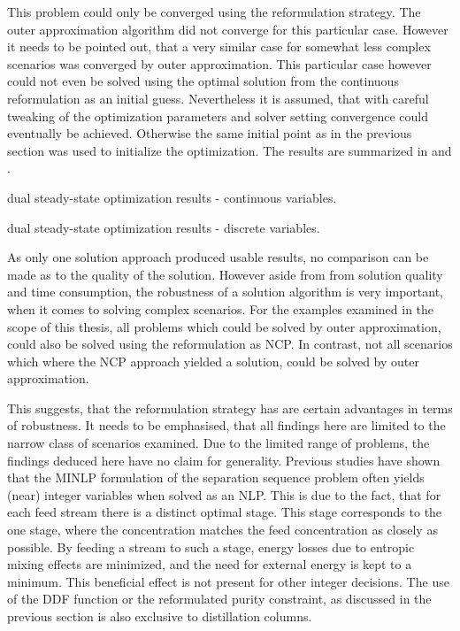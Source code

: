         This problem could only be converged using the reformulation strategy. The outer approximation algorithm
        did not converge for this particular case. However it needs to be pointed out, that a very similar case
        for somewhat less complex scenarios was converged by outer approximation. This particular case however could
        not even be solved using the optimal solution from the continuous reformulation as an initial guess.
        Nevertheless it is assumed, that with careful tweaking of the optimization parameters and solver setting
        convergence could eventually be achieved.
        Otherwise the same initial point as in the previous section was used to initialize the optimization.
        The results are summarized in  and .
        \begin{table}
            \center
            \footnotesize
            
            \caption{dual steady-state optimization results - continuous variables.}
            \label{tab:ss_result_dual_cont}
        \end{table}
        \begin{table}
            \center
            \footnotesize
            
            \caption{dual steady-state optimization results - discrete variables.}
            \label{tab:ss_result_dual_disc}
        \end{table}

        As only one solution approach produced usable results, no comparison can be made as to the quality of the
        solution. However aside from from solution quality and time consumption, the robustness of a solution algorithm
        is very important, when it comes to solving complex scenarios. For the examples examined in the scope of this thesis,
        all problems which could be solved by outer approximation, could also be solved using the reformulation as NCP.
        In contrast, not all scenarios which where the NCP approach yielded a solution, could be solved by outer approximation.

        This suggests, that the reformulation strategy has are certain advantages in terms of robustness. It needs to be emphasised,
        that all findings here are limited to the narrow class of scenarios examined. Due to the limited range of problems, the findings
        deduced here have no claim for generality. Previous studies have shown \cite{Grossmann.2005} that the MINLP formulation
        of the separation sequence problem often yields (near) integer variables when solved as an NLP. This is due to the fact,
        that for each feed stream there is a distinct optimal stage. This stage corresponds to the one stage, where the concentration
        matches the feed concentration as closely as possible. By feeding a stream to such a stage, energy losses due to
        entropic mixing effects are minimized, and the need for external energy is kept to a minimum. This beneficial effect
        is not present for other integer decisions. The use of the DDF function or the reformulated purity constraint, as discussed
        in the previous section is also exclusive to distillation columns.
